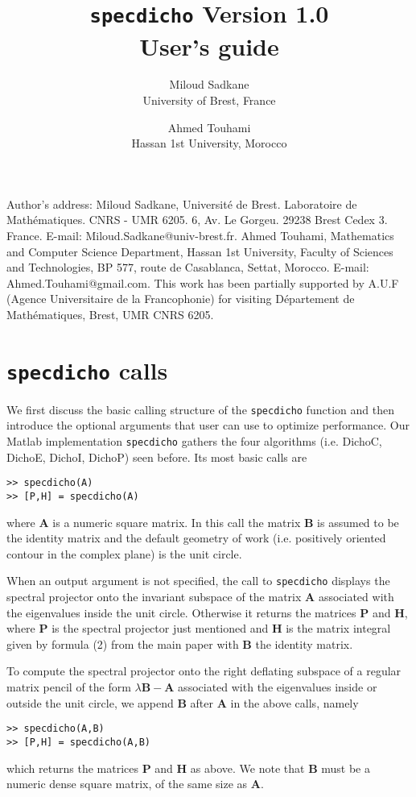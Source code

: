 \documentclass[acmtocl]{acmtrans2m}
\title{{\tt specdicho} Version 1.0\\ User's guide}
\author{Miloud Sadkane\\
University of Brest, France
\and
Ahmed Touhami\\
Hassan 1st University, Morocco}
\newcommand{\Am}{\mathbf{A}}
\newcommand{\Bm}{\mathbf{B}}
\newcommand{\Hm}{\mathbf{H}}
\newcommand{\Pm}{\mathbf{P}}
\begin{document}
\begin{bottomstuff}
Author's address: Miloud Sadkane, Universit\'e de Brest.  Laboratoire de Math\'ematiques.  CNRS - UMR
6205. 6, Av. Le Gorgeu. 29238 Brest Cedex 3. France. E-mail: Miloud.Sadkane@univ-brest.fr.\newline
Ahmed Touhami, Mathematics and Computer Science Department, Hassan 1st University, Faculty of Sciences and Technologies, BP 577, route de Casablanca, Settat, Morocco. E-mail: Ahmed.Touhami@gmail.com. This work has been partially supported by A.U.F (Agence Universitaire de la Francophonie) for visiting D\'epartement  de Math\'ematiques, Brest, UMR CNRS 6205.
\end{bottomstuff}
\maketitle
\section{{\tt specdicho} calls}\label{sec4}
We first discuss the basic calling structure of the {\tt specdicho} function and then introduce the optional arguments that  user can use to optimize performance.
Our {\sc Matlab} implementation {\tt specdicho}  gathers the four algorithms (i.e. {\sc DichoC, DichoE, DichoI, DichoP})  seen before.
Its most basic calls are
\begin{center}
\begin{verbatim}
>> specdicho(A)
>> [P,H] = specdicho(A)
\end{verbatim}
\end{center}
where $\Am$ is a numeric square matrix.
In this call the matrix $\Bm$ is assumed to be the identity matrix and the default geometry of work (i.e. positively oriented contour in the complex plane) is the unit circle.

When an output argument is not specified, the call to {\tt specdicho} displays the spectral projector onto the invariant subspace of the matrix $\Am$ associated with the eigenvalues inside the unit circle.
Otherwise it returns the matrices $\Pm$ and $\Hm$, where $\Pm$ is the spectral projector just mentioned and $\Hm$ is the matrix integral given by formula (2) from the main paper  with $\Bm$ the identity matrix.

To compute the spectral projector onto the right deflating subspace of a regular matrix pencil of the form $\lambda \Bm - \Am$ associated with the eigenvalues inside or outside the unit circle, we append $\Bm$ after $\Am$ in the above calls, namely
\begin{center}
\begin{verbatim}
>> specdicho(A,B)
>> [P,H] = specdicho(A,B)
\end{verbatim}
\end{center}
which returns the matrices $\Pm$ and $\Hm$ as above.
We note that $\Bm$ must be a numeric dense square matrix, of the same size as $\Am$.
\end{document}
